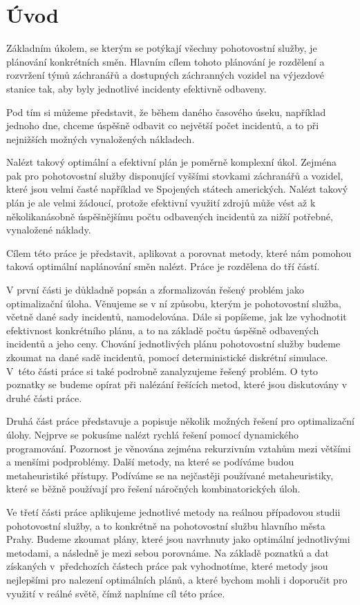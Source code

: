 \chapter*{Úvod}

Základním úkolem, se kterým se potýkají všechny pohotovostní služby, je plánování konkrétních směn.
Hlavním cílem tohoto plánování je rozdělení a rozvržení týmů záchranářů a dostupných záchranných vozidel na
výjezdové stanice tak, aby byly jednotlivé incidenty efektivně odbaveny.

Pod tím si můžeme představit, že během daného časového úseku, například jednoho dne, chceme úspěšně odbavit co největší počet incidentů, a to při nejnižších
možných vynaložených nákladech.

Nalézt takový optimální a efektivní plán je poměrně komplexní úkol. Zejména pak pro pohotovostní služby
disponující vyššími stovkami záchranářů a vozidel, které jsou velmi časté například ve Spojených státech amerických.
Nalézt takový plán je ale velmi žádoucí, protože efektivní využití zdrojů může vést až k několikanásobně úspěšnějšímu
počtu odbavených incidentů za nižší potřebné, vynaložené náklady.

Cílem této práce je představit, aplikovat a porovnat metody, které nám pomohou taková optimální naplánování směn nalézt.
Práce je rozdělena do tří částí.

V první části je důkladně popsán a zformalizován řešený problém jako optimalizační úloha.
Věnujeme se v ní způsobu, kterým je pohotovostní služba, včetně dané sady incidentů, namodelována.
Dále si popíšeme, jak lze vyhodnotit efektivnost konkrétního plánu, a to na základě počtu úspěšně odbavených incidentů a jeho ceny.
Chování jednotlivých plánu pohotovostní služby budeme zkoumat na dané sadě incidentů, pomocí deterministické diskrétní simulace.
V této části práce si také podrobně zanalyzujeme řešený problém.
O tyto poznatky se budeme opírat při nalézání řešících metod, které jsou diskutovány v druhé části práce.

Druhá část práce představuje a popisuje několik možných řešení pro optimalizační úlohy.
Nejprve se pokusíme nalézt rychlá řešení pomocí dynamického programování.
Pozornost je věnována zejména rekurzivním vztahům mezi většími a menšími podproblémy.
Další metody, na které se podíváme budou metaheuristiké přístupy.
Podíváme se na nejčastěji používané metaheuristiky, které se běžně používají pro řešení náročných kombinatorických úloh.

Ve třetí části práce aplikujeme jednotlivé metody na reálnou případovou studii pohotovostní služby, a to konkrétně na pohotovostní službu hlavního města Prahy.
Budeme zkoumat plány, které jsou navrhnuty jako optimální jednotlivými metodami,
a následně je mezi sebou porovnáme. Na základě poznatků a dat získaných v předchozích částech práce pak vyhodnotíme,
které metody jsou nejlepšími pro nalezení optimálních plánů, a které bychom mohli i doporučit pro využití v reálné světě, čímž naplníme cíl této práce. 
